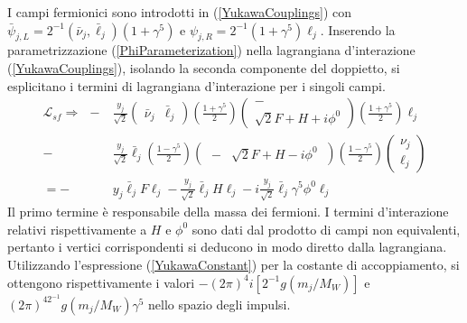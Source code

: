 \documentclass[11pt]{article}
\begin{document}
    I campi fermionici sono introdotti in (\ref{YukawaCouplings}) con $\bar{\psi}_{j,L}=2^{-1}\left(\bar{\nu}_j,\bar{\ell}_j\right)(1+\gamma^5)$ e $\psi_{j,R}=2^{-1}(1+\gamma^5)\ell_{j}$.
    Inserendo la parametrizzazione (\ref{PhiParameterization}) nella lagrangiana d'interazione (\ref{YukawaCouplings}), isolando la seconda componente del doppietto,
    si esplicitano i termini di lagrangiana d'interazione per i singoli campi.
    \begin{equation}
    \begin{split}
    \mathcal{L}_{sf}\Longrightarrow\ \ -&\frac{y_j}{\sqrt{2}}\begin{pmatrix}\bar{\nu}_{j} & \bar{\ell}_{j}\end{pmatrix}\left(\frac{1+\gamma^5}{2}\right)\begin{pmatrix}-\\ \sqrt{2}F+H+i\phi^0\end{pmatrix}\left(\frac{1+\gamma^5}{2}\right)\ell_j\\
    -&\frac{y_j}{\sqrt{2}}\bar{\ell}_j\left(\frac{1-\gamma^5}{2}\right)\begin{pmatrix} \ - &\sqrt{2}F+H-i\phi^0\ \end{pmatrix}\left(\frac{1-\gamma^5}{2}\right)\begin{pmatrix} \nu_j\\ \ell_j \end{pmatrix}\\
    =-&y_j\bar{\ell}_jF\ell_j-\frac{y_j}{\sqrt{2}}\bar{\ell}_j H \ell_j-i\frac{y_j}{\sqrt{2}}\bar{\ell}_j \gamma^5\phi^0 \ell_j
    \end{split}
    \end{equation}
    Il primo termine è responsabile della massa dei fermioni. I termini d'interazione relativi rispettivamente a $H$ e $\phi^0$ sono dati dal prodotto di campi non equivalenti, pertanto i vertici corrispondenti si deducono in modo diretto dalla lagrangiana.
    Utilizzando l'espressione (\ref{YukawaConstant}) per la costante di accoppiamento, si ottengono rispettivamente i valori $-(2\pi)^4i[2^{-1}g(m_j/M_W)]$ e $(2\pi)^42^{-1}g(m_j/M_W)\gamma^5$ nello spazio degli impulsi.
\end{document}
